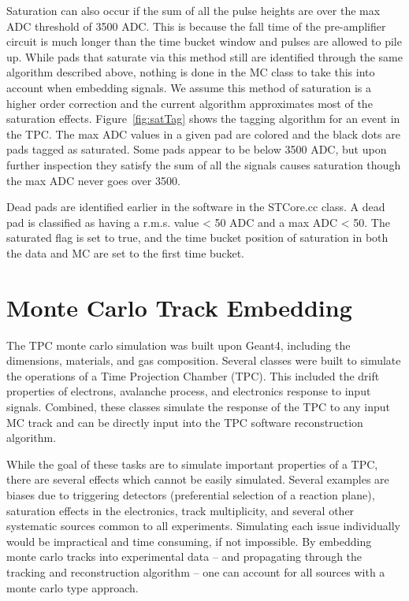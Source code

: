 Saturation can also occur if the sum of all the pulse heights are over the max ADC threshold of 3500 ADC. This is because the fall time of the pre-amplifier circuit is much longer than the time bucket window and pulses are allowed to pile up. While pads that saturate via this method still are identified through the same algorithm described above, nothing is done in the MC class to take this into account when embedding signals. We assume this method of saturation is a higher order correction and the current algorithm approximates most of the saturation effects. Figure~\ref{fig:satTag} shows the tagging algorithm for an event in the TPC. The max ADC values in a given pad are colored and the black dots are pads tagged as saturated. Some pads appear to be below 3500 ADC, but upon further inspection they satisfy the sum of all the signals causes saturation though the max ADC never goes over 3500. 

Dead pads are identified earlier in the software in the STCore.cc class. A dead pad is classified as having a r.m.s. value  < 50 ADC and a max ADC < 50. The saturated flag is set to true, and the time bucket position of saturation in both the data and MC are set to the first time bucket. 





\section{Monte Carlo Track Embedding}
 The TPC monte carlo simulation was built upon Geant4, including the dimensions, materials, and gas composition. Several classes were built to simulate the operations of a Time Projection Chamber (TPC). This included the drift properties of electrons, avalanche process, and electronics response to input signals. Combined, these classes simulate the response of the TPC to any input MC track and can be directly input into the \spirit TPC software reconstruction algorithm. 

While the goal of these tasks are to simulate important properties of a TPC, there are several effects which cannot be easily simulated. Several examples are biases due to triggering detectors (preferential selection of a reaction plane), saturation effects in the electronics, track multiplicity, and several other systematic sources common to all experiments. Simulating each issue individually would be impractical and time consuming, if not impossible. By embedding monte carlo tracks into experimental data -- and propagating through the tracking and reconstruction algorithm -- one can account for all sources with a monte carlo type approach.


